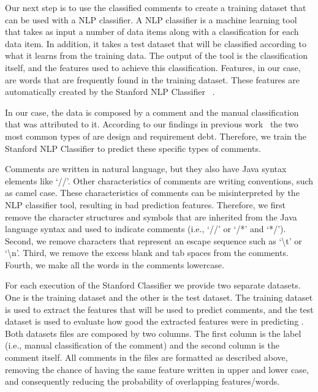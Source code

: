 
Our next step is to use the classified \SATD comments to create a training dataset that can be used with a NLP classifier. A NLP classifier is a machine learning tool that takes as input a number of data items along with a classification for each data item. In addition, it takes a test dataset that will be classified according to what it learns from the training data. The output of the tool is the classification itself, and the features used to achieve this classification. Features, in our case, are words that are frequently found in the training dataset. These features are automatically created by the Stanford NLP Classifier ~\cite{Manning2014ACL}. 

In our case, the data is composed by a comment and the manual classification that was attributed to it. According to our findings in previous work~\cite{Maldonado2015MTD} the two most common types of \SATD are design and requirement debt. Therefore, we train the Stanford NLP Classifier to predict these specific types of \SATD comments.


Comments are written in natural language, but they also have Java syntax elements like `//'. Other characteristics of comments are writing conventions, such as camel case. These characteristics of comments can be misinterpreted by the NLP classifier tool, resulting in bad prediction features. Therefore, we first remove the character structures and symbols that are inherited from the Java language syntax and used to indicate comments (i.e., `//' or `/*' and `*/'). Second, we remove characters that represent an escape sequence such as `\textbackslash t' or `\textbackslash n'. Third, we remove the excess blank and tab spaces from the comments. Fourth, we make all the words in the comments lowercase.

For each execution of the Stanford Classifier we provide two separate datasets. One is the training dataset and the other is the test dataset. The training dataset is used to extract the features that will be used to predict \SATD comments, and the test dataset is used to evaluate how good the extracted features were in predicting \SATD. Both datasets files are composed by two columns. The first column is the label (i.e., manual classification of the comment) and the second column is the comment itself. All comments in the files are formatted as described above, removing the chance of having the same feature written in upper and lower case, and consequently reducing the probability of overlapping features/words. 

